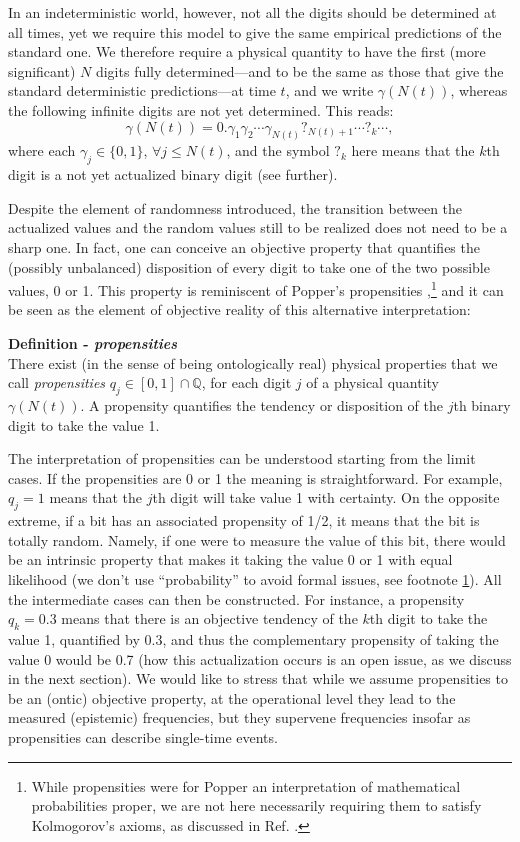 \documentclass[12pt]{article}
\newcommand{\Q}{\mathbb{Q}}
\begin{document}
In an indeterministic world, however, not all the digits should be determined at all times, yet we require this model to give the same empirical predictions of the standard one. We therefore require a physical quantity to have the first (more significant) $N$ digits fully determined---and to be the same as those that give the standard deterministic predictions---at time $t$, and we write $\gamma(N(t))$, whereas the following infinite digits are not yet determined. This reads:
%
\begin{equation*}
\gamma \left(N(t)\right)=0.\gamma_1\gamma_2\cdots \gamma_{N(t)} ?_{N(t)+1}\cdots ?_k\cdots,
\end{equation*}
%
where each $\gamma_j\in\{0,1\}$, $\forall j\leq N(t)$, and the symbol $?_k$ here means that the $k$th digit is a not yet actualized binary digit (see further).

Despite the element of randomness introduced, the transition between the actualized values and the random values still to be realized does not need to be a sharp one. In fact, one can conceive an objective property that quantifies the (possibly unbalanced) disposition of every digit to take one of the two possible values, 0 or 1. This property is reminiscent of Popper's propensities \cite{popper},\footnote{\label{note}While propensities were for Popper an interpretation of mathematical probabilities proper, we are not here necessarily requiring them to satisfy Kolmogorov's axioms, as discussed in Ref. \cite{gisin2}.} and it can be seen as the element of objective reality of this alternative interpretation:


\textbf{Definition - \textit{propensities}}\\
There exist (in the sense of  being ontologically real) physical properties that we call \emph{propensities} $q_j\in [0,1] \cap \Q$, for each digit $j$ of a physical quantity $\gamma(N(t))$. A propensity quantifies the tendency or disposition of the $j$th binary digit to take the value 1.

{The interpretation of propensities can be understood starting from the limit cases. If the propensities are 0 or 1 the meaning is straightforward. For example, $q_j=1$ means that the $j$th digit will take value 1 with certainty. On the opposite extreme, if a bit has an associated propensity of 1/2, it means that the bit is totally random. Namely, if one were to measure the value of this bit, there would be an intrinsic property that makes it taking the value 0 or 1 with equal likelihood (we don't use ``probability'' to avoid formal issues, see footnote \ref{note}). All the intermediate cases can then be constructed. For instance, a propensity $q_k=0.3$ means that there is an objective tendency of the $k$th digit to take the value 1, quantified by 0.3, and thus the complementary propensity of taking the value 0 would be 0.7 (how this actualization occurs is an open issue, as we discuss in the next section). We would like to stress that while we assume propensities to be an (ontic) objective property, at the operational level they lead to the measured (epistemic) frequencies, but they supervene frequencies insofar as propensities can describe single-time events.}
\end{document}
